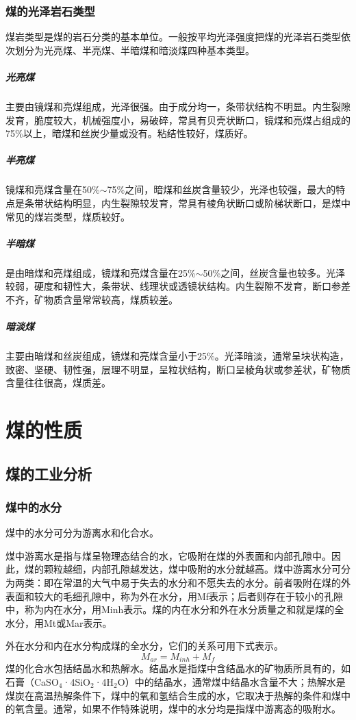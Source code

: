 \documentclass[10pt,openany]{ctexbook}
\begin{document}
\subsubsection{煤的光泽岩石类型}
    煤岩类型是煤的岩石分类的基本单位。一般按平均光泽强度把煤的光泽岩石类型依次划分为光亮煤、半亮煤、半暗煤和暗淡煤四种基本类型。
\subparagraph{光亮煤}  主要由镜煤和亮煤组成，光泽很强。由于成分均一，条带状结构不明显。内生裂隙发育，脆度较大，机械强度小，易破碎，常具有贝壳状断口，镜煤和亮煤占组成的75\%以上，暗煤和丝炭少量或没有。粘结性较好，煤质好。
\subparagraph{半亮煤} 镜煤和亮煤含量在50\%$\sim$75\%之间，暗煤和丝炭含量较少，光泽也较强，最大的特点是条带状结构明显，内生裂隙较发育，常具有棱角状断口或阶梯状断口，是煤中常见的煤岩类型，煤质较好。
\subparagraph{半暗煤} 是由暗煤和亮煤组成，镜煤和亮煤含量在25\%$\sim$50\%之间，丝炭含量也较多。光泽较弱，硬度和韧性大，条带状、线理状或透镜状结构。内生裂隙不发育，断口参差不齐，矿物质含量常常较高，煤质较差。
\subparagraph{暗淡煤}  主要由暗煤和丝炭组成，镜煤和亮煤含量小于25\%。光泽暗淡，通常呈块状构造，致密、坚硬、韧性强，层理不明显，呈粒状结构，断口呈棱角状或参差状，矿物质含量往往很高，煤质差。

\section{煤的性质}
\subsection{煤的工业分析}
\subsubsection{煤中的水分} 煤中的水分可分为游离水和化合水。\par
    煤中游离水是指与煤呈物理态结合的水，它吸附在煤的外表面和内部孔隙中。因此，煤的颗粒越细，内部孔隙越发达，煤中吸附的水分就越高。煤中游离水分可分为两类：即在常温的大气中易于失去的水分和不愿失去的水分。前者吸附在煤的外表面和较大的毛细孔隙中，称为外在水分，用Mf表示；后者则存在于较小的孔隙中，称为内在水分，用Minh表示。煤的内在水分和外在水分质量之和就是煤的全水分，用Mt或Mar表示。\par
        外在水分和内在水分构成煤的全水分，它们的关系可用下式表示。
        $$M_{ar}=M_{inh}+M_{f}$$
        煤的化合水包括结晶水和热解水。结晶水是指煤中含结晶水的矿物质所具有的，如石膏（CaSO$_4$·4SiO$_2$·4H$_2$O）中的结晶水，通常煤中结晶水含量不大；热解水是煤炭在高温热解条件下，煤中的氧和氢结合生成的水，它取决于热解的条件和煤中的氧含量。通常，如果不作特殊说明，煤中的水分均是指煤中游离态的吸附水。
\end{document}
